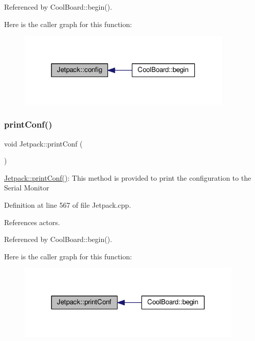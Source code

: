 Referenced by Cool\+Board\+::begin().

Here is the caller graph for this function\+:\nopagebreak
\begin{figure}[H]
\begin{center}
\leavevmode
\includegraphics[width=291pt]{df/d1d/class_jetpack_ab065ee83e244265a2223a22f3ee4a719_icgraph}
\end{center}
\end{figure}
\mbox{\label{class_jetpack_ac54a7bb4f9166bee32052253d9b1d306}} 
\subsubsection{\texorpdfstring{print\+Conf()}{printConf()}}
{\footnotesize\ttfamily void Jetpack\+::print\+Conf (\begin{DoxyParamCaption}{ }\end{DoxyParamCaption})}

\hyperlink{class_jetpack_ac54a7bb4f9166bee32052253d9b1d306}{Jetpack\+::print\+Conf()}\+: This method is provided to print the configuration to the Serial Monitor 

Definition at line 567 of file Jetpack.\+cpp.



References actors.



Referenced by Cool\+Board\+::begin().

Here is the caller graph for this function\+:\nopagebreak
\begin{figure}[H]
\begin{center}
\leavevmode
\includegraphics[width=305pt]{df/d1d/class_jetpack_ac54a7bb4f9166bee32052253d9b1d306_icgraph}
\end{center}
\end{figure}


